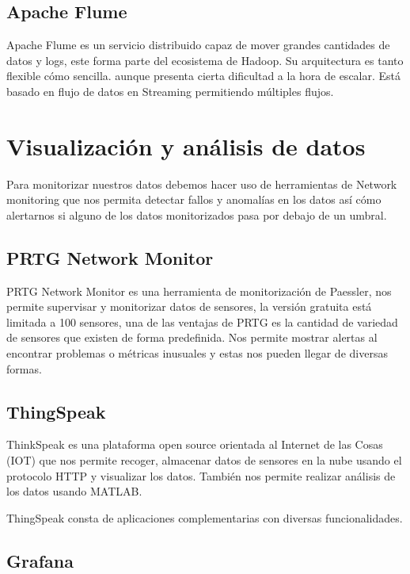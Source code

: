 \subsection{Apache Flume}

Apache Flume es un servicio distribuido capaz de mover grandes cantidades de datos y logs, este forma parte del ecosistema de Hadoop. Su arquitectura es tanto flexible cómo sencilla. aunque presenta cierta dificultad a la hora de escalar. Está basado en flujo de datos en Streaming permitiendo múltiples flujos.\cite{pagina:Flume}

\section{Visualización y análisis de datos}

Para monitorizar nuestros datos debemos hacer uso de herramientas de Network monitoring que nos permita detectar fallos y anomalías en los datos así cómo alertarnos si alguno de los datos monitorizados pasa por debajo de un umbral.

\subsection{PRTG Network Monitor}

PRTG Network Monitor es una herramienta de monitorización de Paessler, nos permite supervisar y monitorizar datos de sensores, la versión gratuita está limitada a 100 sensores, una de las ventajas de PRTG es la cantidad de variedad de sensores que existen de forma predefinida. Nos permite mostrar alertas al encontrar problemas o métricas inusuales y estas nos pueden llegar de diversas formas.\cite{pagina:PRTG}

\subsection{ThingSpeak}

ThinkSpeak es una plataforma open source orientada al Internet de las Cosas (IOT) que nos permite recoger, almacenar datos de sensores en la nube usando el protocolo HTTP y visualizar los datos. También nos permite realizar análisis de los datos usando MATLAB. 

ThingSpeak consta de aplicaciones complementarias con diversas funcionalidades. \cite{pagina:ThingSpeak}

\subsection{Grafana}

